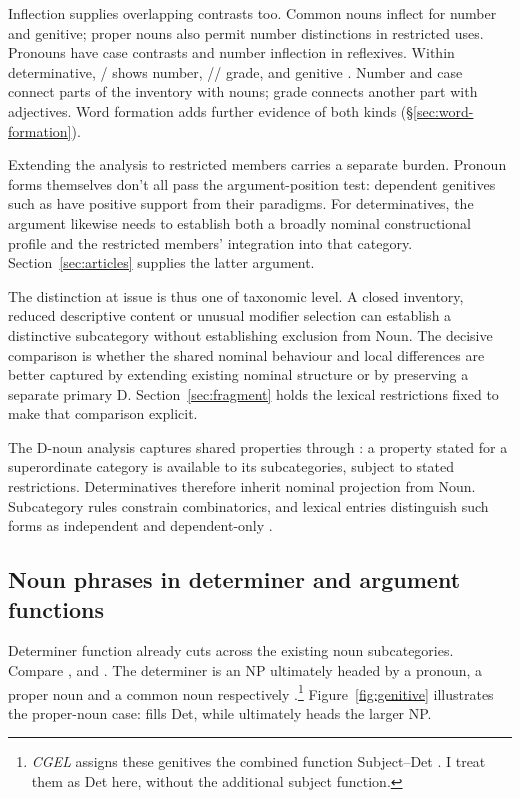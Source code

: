 \documentclass[12pt]{article}
\begin{document}
Inflection supplies overlapping contrasts too. Common nouns inflect for number and genitive; proper nouns also permit number distinctions in restricted uses. Pronouns have case contrasts and number inflection in reflexives. Within determinative, / shows number, // grade, and  genitive \citep[373, 423--424, 426, 479--480, 521]{huddleston2002}. Number and case connect parts of the inventory with nouns; grade connects another part with adjectives. Word formation adds further evidence of both kinds (§\ref{sec:word-formation}).

Extending the analysis to restricted members carries a separate burden. Pronoun forms themselves don't all pass the argument-position test: dependent genitives such as  have positive support from their paradigms. For determinatives, the argument likewise needs to establish both a broadly nominal constructional profile and the restricted members' integration into that category. Section~\ref{sec:articles} supplies the latter argument.

The distinction at issue is thus one of taxonomic level. A closed inventory, reduced descriptive content or unusual modifier selection can establish a distinctive subcategory without establishing exclusion from Noun. The decisive comparison is whether the shared nominal behaviour and local differences are better captured by extending existing nominal structure or by preserving a separate primary D. Section~\ref{sec:fragment} holds the lexical restrictions fixed to make that comparison explicit.

The D-noun analysis captures shared properties through : a property stated for a superordinate category is available to its subcategories, subject to stated restrictions. Determinatives therefore inherit nominal projection from Noun. Subcategory rules constrain combinatorics, and lexical entries distinguish such forms as independent  and dependent-only .

\subsection{Noun phrases in determiner and argument functions}\label{sec:bridge}

Determiner function already cuts across the existing noun subcategories. Compare ,  and . The determiner is an NP ultimately headed by a pronoun, a proper noun and a common noun respectively \citep[354--355, 470--471]{huddleston2002}.\footnote{\textit{CGEL} assigns these genitives the combined function Subject--Det \citep[472--473]{huddleston2002}. I treat them as Det here, without the additional subject function.} Figure~\ref{fig:genitive} illustrates the proper-noun case:  fills Det, while  ultimately heads the larger NP.
\end{document}

